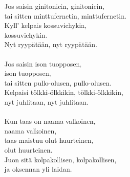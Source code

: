 
Jos saisin ginitonicin, ginitonicin, \\ tai sitten minttufernetin, minttufernetin. \\ Kyll' kelpais kossuvichykin, \\ kossuvichykin. \\ Nyt ryypätään, nyt ryypätään. \\ \hspace{10mm} \\ Jos saisin ison tuopposen, \\ ison tuopposen, \\ tai sitten pullo-olusen, pullo-olusen. \\ Kelpaisi tölkki-ölkkikin, tölkki-ölkkikin, \\ nyt juhlitaan, nyt juhlitaan. \\ \hspace{10mm} \\ Kun taas on naama valkoinen, \\ naama valkoinen, \\ taas maistuu olut huurteinen, \\ olut huurteinen. \\ Juon sitä kolpakollisen, kolpakollisen, \\ ja oksennan yli laidan.